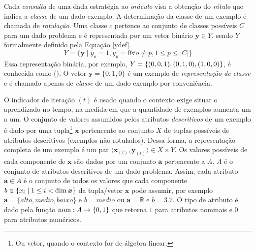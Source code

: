 Cada \textit{consulta} de uma dada estratégia ao \textit{oráculo} visa a obtenção
do \textit{rótulo} que indica a \textit{classe} de um dado exemplo.
A determinação da classe de um exemplo é chamada de \textit{rotulação}.
Uma classe $c$ pertence ao conjunto de classes possíveis $C$ para um dado problema e
é representada por um vetor binário $\bm{y} \in Y$,
sendo $Y$ formalmente definido pela Equação \ref{ydef}.
\begin{equation}\label{ydef}
 Y = \{\bm{y} \mid y_o=1, y_p=0 \forall o \neq p, 1 \leq p \leq |C|\}
\end{equation}
Essa representação binária, por exemplo, $Y=\{(0,0,1),(0,1,0),(1,0,0)\}$,
é conhecida como  (\cite{Harris:2007:DDC}).
O vetor $\bm{y}=\{0,1,0\}$ é um exemplo de \textit{representação de classe} e é
chamado apenas de \textit{classe} de um dado exemplo por conveniência.

O indicador de iteração $(t)$ é usado quando o contexto exige situar o aprendizado
no tempo, na medida em que a quantidade de exemplos aumenta um a um.
O conjunto de valores assumidos pelos atributos \textit{descritivos} de um exemplo
é dado por uma tupla\footnote {Ou vetor, quando o contexto for de álgebra linear.}
$\bm{x}$ pertencente ao conjunto $X$ de tuplas possíveis de atributos descritivos
(exemplos não rotulados).
Dessa forma, a representação completa de um exemplo é um par
$\langle \bm{x}_{(t)}, \bm{y}_{(t)} \rangle \in X\times Y$.
Os valores possíveis de cada componente de $\bm{x}$ são dados por um conjunto
$\bm{a}$ pertencente a $A$. $A$ é o conjunto de atributos descritivos de um dado problema.
Assim, cada atributo $\bm{a} \in A$ é o conjunto de todos os valores que cada componente
$b \in \{x_i \mid 1 \leq i < \operatorname*{dim}{\bm{x}}\}$ da tupla/vetor $\bm{x}$ pode assumir,
por exemplo $\bm{a}=\{\textit{alto},\textit{medio},\textit{baixo}\}$ e $b=medio$ ou
$\bm{a} = \mathbb{R}$ e $b=3.7$.
O tipo de atributo é dado pela função $\operatorname*{nom}:A\rightarrow\{0,1\}$ que retorna $1$ para
atributos nominais e $0$ para atributos numéricos.

